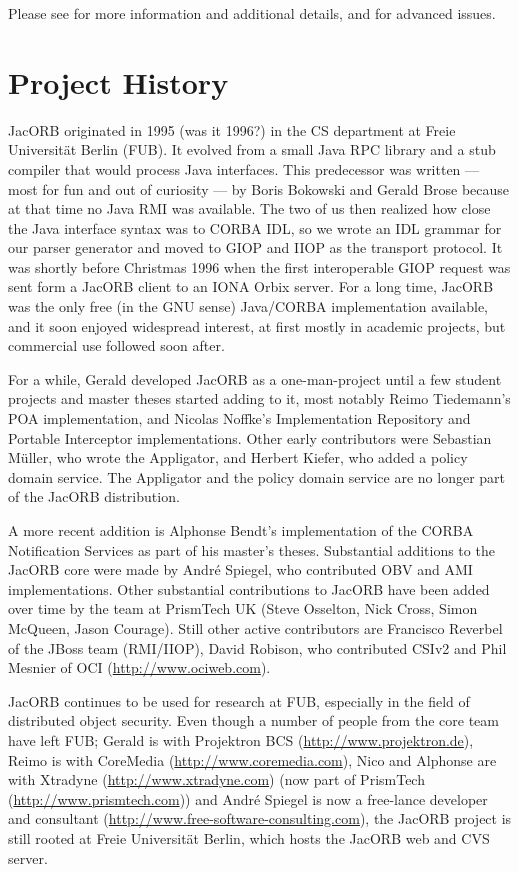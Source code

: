 Please see \cite{Brose2001a,Siegel2000, Vinoski1997} for more
information and additional details, and \cite{Henning1999} for
advanced issues.

\section{Project History}

JacORB originated in 1995 (was it 1996?) in the CS department at Freie
Universit{\"a}t Berlin (FUB). It evolved from a small Java RPC library and a
stub compiler that would process Java interfaces. This predecessor was
written --- most for fun and out of curiosity --- by Boris Bokowski
and Gerald Brose because at that time no Java RMI was available. The
two of us then realized how close the Java interface syntax was to
CORBA IDL, so we wrote an IDL grammar for our parser generator and
moved to GIOP and IIOP as the transport protocol. It was shortly
before Christmas 1996 when the first interoperable GIOP request was
sent form a JacORB client to an IONA Orbix server. For a long time,
JacORB was the only free (in the GNU sense) Java/CORBA implementation
available, and it soon enjoyed widespread interest, at first mostly in
academic projects, but commercial use followed soon after.

For a while, Gerald developed JacORB as a one-man-project until a few
student projects and master theses started adding to it, most notably
Reimo Tiedemann's POA implementation, and Nicolas Noffke's
Implementation Repository and Portable Interceptor implementations.
Other early contributors were Sebastian M{\"u}ller, who wrote the
Appligator, and Herbert Kiefer, who added a policy domain service. The
Appligator and the policy domain service are no longer part of the
JacORB distribution.

A more recent addition is Alphonse Bendt's implementation of the CORBA
Notification Services as part of his master's theses. Substantial
additions to the JacORB core were made by Andr{\'e} Spiegel, who
contributed OBV and AMI implementations. Other substantial
contributions to JacORB have been added over time by the team at
PrismTech UK (Steve Osselton, Nick Cross, Simon McQueen, Jason
Courage). Still other active contributors are Francisco Reverbel of
the JBoss team (RMI/IIOP), David Robison, who contributed CSIv2 and
Phil Mesnier of OCI (\href{http://www.ociweb.com}{http://www.ociweb.com}).

JacORB continues to be used for research at FUB, especially in the
field of distributed object security. Even though a number of people
from the core team have left FUB; Gerald is with Projektron BCS
(\href{http://www.projektron.de}{http://www.projektron.de}), Reimo is
with CoreMedia (\href{http://www.coremedia.com}{http://www.coremedia.com}),
Nico and Alphonse are with Xtradyne (\href{http://www.xtradyne.com}
{http://www.xtradyne.com}) (now part of PrismTech
(\href{http://www.prismtech.com}{http://www.prismtech.com})) and Andr{\'e}
Spiegel is now a free-lance developer and consultant
(\href{http://www.free-software-consulting.com}
{http://www.free-software-consulting.com}), the JacORB project is still
rooted at Freie Universit{\"a}t Berlin, which hosts the JacORB web and CVS server.

